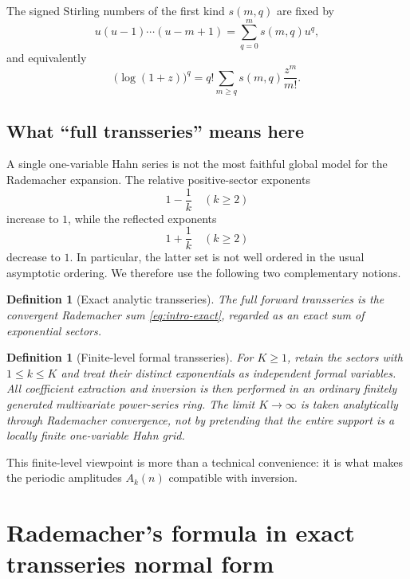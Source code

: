 \documentclass[11pt,a4paper]{article}
\numberwithin{equation}{section}
\newtheorem{definition}[theorem]{Definition}
\theoremstyle{remark}
\begin{document}
The signed Stirling numbers of the first kind $s(m,q)$ are fixed by
\begin{equation}\label{eq:stirling-signed}
 u(u-1)\cdots(u-m+1)=\sum_{q=0}^{m}s(m,q)u^q,
\end{equation}
and equivalently
\begin{equation}\label{eq:log-stirling}
 \bigl(\log(1+z)\bigr)^q=q!\sum_{m\ge q}s(m,q)\frac{z^m}{m!}.
\end{equation}

\subsection{What ``full transseries'' means here}

A single one-variable Hahn series is not the most faithful global model for the Rademacher expansion.  The relative positive-sector exponents
\[
 1-\frac1k\quad(k\ge2)
\]
increase to $1$, while the reflected exponents
\[
 1+\frac1k\quad(k\ge2)
\]
decrease to $1$.  In particular, the latter set is not well ordered in the usual asymptotic ordering.  We therefore use the following two complementary notions.

\begin{definition}[Exact analytic transseries]
The full forward transseries is the convergent Rademacher sum \cref{eq:intro-exact}, regarded as an exact sum of exponential sectors.
\end{definition}

\begin{definition}[Finite-level formal transseries]
For $K\ge1$, retain the sectors with $1\le k\le K$ and treat their distinct exponentials as independent formal variables.  All coefficient extraction and inversion is then performed in an ordinary finitely generated multivariate power-series ring.  The limit $K\to\infty$ is taken analytically through Rademacher convergence, not by pretending that the entire support is a locally finite one-variable Hahn grid.
\end{definition}

This finite-level viewpoint is more than a technical convenience: it is what makes the periodic amplitudes $A_k(n)$ compatible with inversion.

\section{Rademacher's formula in exact transseries normal form}\label{sec:exact-forward}
\end{document}
